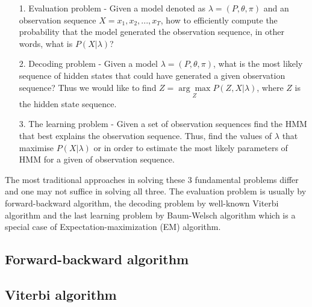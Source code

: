 \begin{itemize}
\item[1.] Evaluation problem - Given a model denoted as $\lambda = (P,\theta,\pi)$ and an observation sequence $X = x_1, x_2,...,x_T$, how to efficiently compute the probability that the model generated the observation sequence, in other words, what is $P(X|\lambda)$? 
\item[2.] Decoding problem - Given a model $\lambda = (P,\theta,\pi)$, what is the most likely sequence of hidden states that could have generated a given observation sequence? Thus we would like to find $Z = \underset{Z}{\arg\max} P(Z,X|\lambda)$, where $Z$ is the hidden state sequence. 
\item[3.] The learning problem - Given a set of observation sequences find the HMM that best explains the observation sequence. Thus, find the values of $\lambda$ that maximise $P(X|\lambda)$ or in order to estimate the most likely parameters of HMM for a given of observation sequence. 
\end{itemize}

The most traditional approaches in solving these 3 fundamental problems differ and one may not suffice in solving all three. The evaluation problem is usually by forward-backward algorithm, the decoding problem by well-known Viterbi algorithm and the last learning problem by Baum-Welsch algorithm which is a special case of Expectation-maximization (EM) algorithm. 


\subsection{Forward-backward algorithm}




\subsection{Viterbi algorithm}



